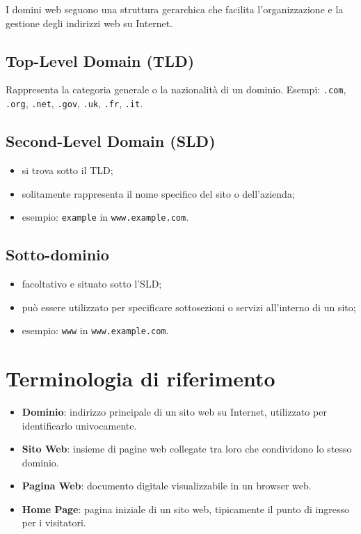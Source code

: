 I domini web seguono una struttura gerarchica che facilita l'organizzazione e la gestione degli indirizzi web su Internet.

\subsection{Top-Level Domain (TLD)}

Rappresenta la categoria generale o la nazionalità di un dominio. Esempi: \texttt{.com}, \texttt{.org}, \texttt{.net}, \texttt{.gov}, \texttt{.uk}, \texttt{.fr}, \texttt{.it}.

\subsection{Second-Level Domain (SLD)}

\begin{itemize}
    \item si trova sotto il TLD;
    \item solitamente rappresenta il nome specifico del sito o dell'azienda;
    \item esempio: \texttt{example} in \texttt{www.example.com}.
\end{itemize}

\subsection{Sotto-dominio}

\begin{itemize}
    \item facoltativo e situato sotto l'SLD;
    \item può essere utilizzato per specificare sottosezioni o servizi all'interno di un sito;
    \item esempio: \texttt{www} in \texttt{www.example.com}.
\end{itemize}

\section{Terminologia di riferimento}

\begin{itemize}
    \item \textbf{Dominio}: indirizzo principale di un sito web su Internet, utilizzato per identificarlo univocamente.
    \item \textbf{Sito Web}: insieme di pagine web collegate tra loro che condividono lo stesso dominio.
    \item \textbf{Pagina Web}: documento digitale visualizzabile in un browser web.
    \item \textbf{Home Page}: pagina iniziale di un sito web, tipicamente il punto di ingresso per i visitatori.
\end{itemize}
